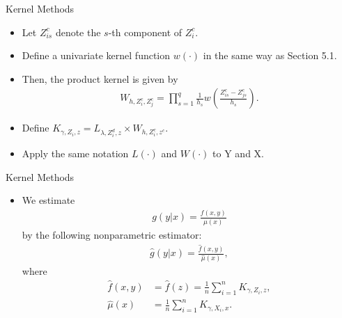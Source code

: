 \documentclass[xcolor=svgnames,dvipdfmx,cjk]{beamer}
\theoremstyle{example}
\begin{document}
\begin{frame}{Kernel Methods}
  \begin{itemize}
    \item Let $Z_{is}^c$ denote the $s$-th component of $Z_i^c$.
    \item Define a univariate kernel function $w(\cdot)$ in the same way as Section 5.1.
    \item Then, the product kernel is given by 
          \begin{align*}
            W_{h, Z_i^c , Z_j^c}
            =
            \prod_{s=1}^{q} \frac{1}{h_s} w \left( \frac{Z_{is}^c - Z_{js}^c}{h_s} \right).
          \end{align*}
    \item Define 
          $K_{\gamma, Z_i, z} 
           = L_{\lambda, Z_{i}^d , z} 
             \times 
             W_{h, Z_i^c , z^c}$.
    \item Apply the same notation $L(\cdot)$ and $W(\cdot)$ to Y and X.
  \end{itemize}
\end{frame}

\begin{frame}{Kernel Methods}
  \begin{itemize}
    \item We estimate 
          \begin{align*}
            g(y|x) = \frac{f(x,y)}{\mu(x)}
          \end{align*}
          by the following nonparametric estimator:
          \begin{align*}
            \hat{g}(y|x) = \frac{\hat{f}(x,y)}{\hat{\mu}(x)} ,
          \end{align*}
          where
          \begin{align*}
            \hat{f}(x,y) 
              &= \hat{f}(z) 
               = \frac{1}{n} \sum_{i=1}^n K_{\gamma, Z_i, z} , \\
            \hat{\mu}(x) 
              &= \frac{1}{n} \sum_{i=1}^n K_{\gamma, X_i, x}.
          \end{align*}
  \end{itemize}
\end{frame}
\end{document}

